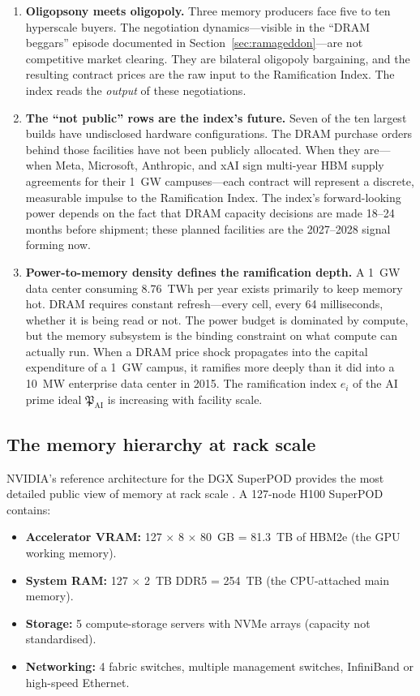 \documentclass[12pt]{article}
\theoremstyle{definition}
\begin{document}
\begin{enumerate}[itemsep=4pt]
\item \textbf{Oligopsony meets oligopoly.} Three memory producers face five to ten hyperscale buyers. The negotiation dynamics---visible in the ``DRAM beggars'' episode documented in Section~\ref{sec:ramageddon}---are not competitive market clearing. They are bilateral oligopoly bargaining, and the resulting contract prices are the raw input to the Ramification Index. The index reads the \emph{output} of these negotiations.

\item \textbf{The ``not public'' rows are the index's future.} Seven of the ten largest builds have undisclosed hardware configurations. The DRAM purchase orders behind those facilities have not been publicly allocated. When they are---when Meta, Microsoft, Anthropic, and xAI sign multi-year HBM supply agreements for their 1~GW campuses---each contract will represent a discrete, measurable impulse to the Ramification Index. The index's forward-looking power depends on the fact that DRAM capacity decisions are made 18--24 months before shipment; these planned facilities are the 2027--2028 signal forming now.

\item \textbf{Power-to-memory density defines the ramification depth.} A 1~GW data center consuming 8.76~TWh per year exists primarily to keep memory hot. DRAM requires constant refresh---every cell, every 64 milliseconds, whether it is being read or not. The power budget is dominated by compute, but the memory subsystem is the binding constraint on what compute can actually run. When a DRAM price shock propagates into the capital expenditure of a 1~GW campus, it ramifies more deeply than it did into a 10~MW enterprise data center in 2015. The ramification index $e_i$ of the AI prime ideal $\mathfrak{P}_{\text{AI}}$ is increasing with facility scale.
\end{enumerate}

\subsection{The memory hierarchy at rack scale}

NVIDIA's reference architecture for the DGX SuperPOD provides the most detailed public view of memory at rack scale \cite{NVIDIASuperpod2024}. A 127-node H100 SuperPOD contains:

\begin{itemize}[itemsep=2pt]
\item \textbf{Accelerator VRAM:} 127 $\times$ 8 $\times$ 80~GB = 81.3~TB of HBM2e (the GPU working memory).
\item \textbf{System RAM:} 127 $\times$ 2~TB DDR5 = 254~TB (the CPU-attached main memory).
\item \textbf{Storage:} 5 compute-storage servers with NVMe arrays (capacity not standardised).
\item \textbf{Networking:} 4 fabric switches, multiple management switches, InfiniBand or high-speed Ethernet.
\end{itemize}
\end{document}

